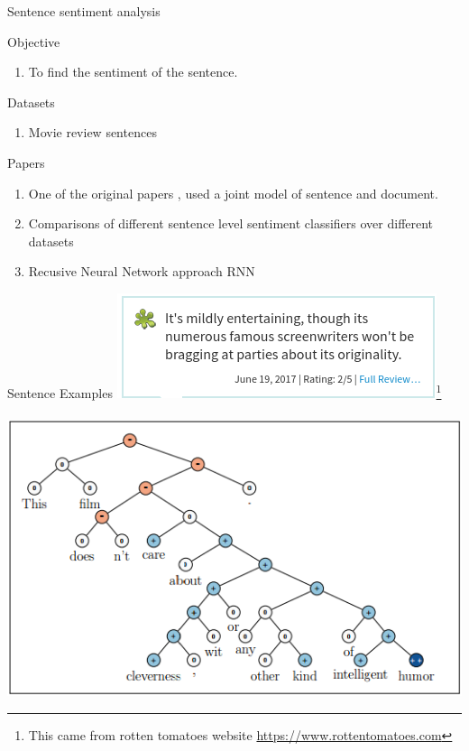 \documentclass[10pt]{beamer}
\begin{document}
\begin{frame}{Sentence sentiment analysis}
  \begin{block}{Objective}
    \begin{enumerate}
      \item To find the sentiment of the sentence.
    \end{enumerate}
  \end{block}
  \begin{block}{Datasets}
    \begin{enumerate}
      \item Movie review sentences \cite{pang05} 
    \end{enumerate}
  \end{block}
  \begin{block}{Papers}
    \begin{enumerate}
      \item One of the original papers \cite{McDonald07}, used a joint model of sentence and document.
      \item Comparisons of different sentence level sentiment classifiers over different datasets \cite{Ribeiro16}
      \item Recusive Neural Network approach RNN \cite{Socher13}
    \end{enumerate}
  \end{block}
  
\end{frame}

\begin{frame}{Sentence Examples}
  \centering
  \includegraphics[scale=0.7]{examples/sentence_example.png}\footnote{This came from rotten tomatoes website \url{https://www.rottentomatoes.com}} \\~\\
   \includegraphics[scale=0.3]{examples/RNTN_example.png}\cite{Socher13}
\end{frame}
\end{document}
